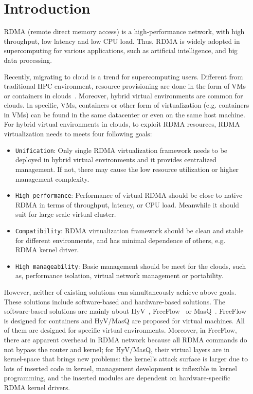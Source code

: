 \section{Introduction}
RDMA (remote direct memory access) is a high-performance network,  with high throughput, low latency and low CPU load. Thus, RDMA is widely adopted in supercomputing for various applications,  such as artificial intelligence, and big data processing. 

Recently, migrating to cloud is a trend for supercomputing users. Different from traditional HPC environment, resource provisioning are done in the form of VMs or containers in clouds~\cite{hpc-cloud}. Moreover, hybrid virtual environments are common for clouds. In specific, VMs, containers or other form of virtualization (e.g. containers in VMs) can be found in the same datacenter or even on the same host machine. For hybrid virtual environments in clouds,  to exploit RDMA resources, RDMA virtualization needs to meets four following goals:

\begin{itemize}
	\item {\verb|Unification|}: Only single RDMA virtualization framework needs to be deployed in hybrid virtual environments and it provides centralized management. If not, there may cause the low resource utilization or higher management complexity.
	\item {\verb|High performance|}: Performance of virtual RDMA should be close to native RDMA in terms of throughput, latency, or CPU load. Meanwhile it should suit for large-scale virtual cluster.
	\item {\verb|Compatibility|}: RDMA virtualization framework should be clean and stable for different environments, and has minimal dependence of others, e.g. RDMA kernel driver.
	\item {\verb|High manageability|}: Basic management should be meet for the clouds, such as, performance isolation, virtual network management or portability.
\end{itemize}

However, neither of existing solutions can simultaneously achieve above goals. These solutions include software-based and hardware-based solutions. The software-based solutions are mainly about HyV~\cite{pfefferle2015hybrid}, FreeFlow~\cite{kim2019freeflow} or MasQ~\cite{he2020masq}. FreeFlow is  designed for containers and HyV/MasQ are proposed for virtual machines. All of them are designed for specific virtual environments. Moreover, in FreeFlow, there are apparent overhead in RDMA network because all RDMA commands do not bypass the router and kernel; for HyV/MasQ, their virtual layers are in kernel-space that brings new problems: the kernel's attack surface is larger due to lots of inserted code in kernel, management development is inflexible in kernel programming, and the inserted modules are dependent on hardware-specific RDMA kernel drivers.

